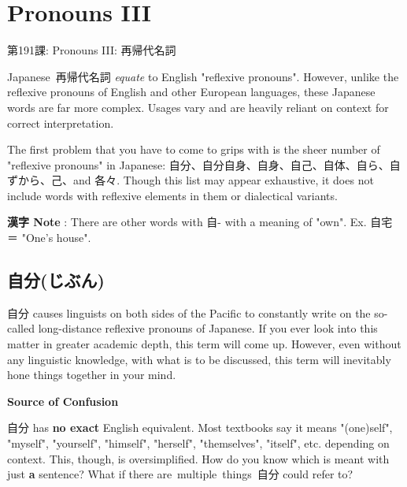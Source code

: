     
\chapter{Pronouns III}

\begin{center}
\begin{Large}
第191課: Pronouns III: 再帰代名詞 
\end{Large}
\end{center}
 
\par{ Japanese 再帰代名詞 \emph{equate }to English "reflexive pronouns". However, unlike the reflexive pronouns of English and other European languages, these Japanese words are far more complex. Usages vary and are heavily reliant on context for correct interpretation. }

\par{ The first problem that you have to come to grips with is the sheer number of "reflexive pronouns" in Japanese: 自分、自分自身、自身、自己、自体、自ら、自ずから、己、and 各々. Though this list may appear exhaustive, it does not include words with reflexive elements in them or dialectical variants. }

\par{\textbf{漢字 Note }: There are other words with 自- with a meaning of "own". Ex. 自宅　＝ "One's house". }
      
\section{自分(じぶん)}
 
\par{ 自分 causes linguists on both sides of the Pacific to constantly write on the so-called long-distance reflexive pronouns of Japanese. If you ever look into this matter in greater academic depth, this term will come up. However, even without any linguistic knowledge, with what is to be discussed, this term will inevitably hone things together in your mind. }

\begin{center}
 \textbf{Source of Confusion }
\end{center}

\par{ 自分 has \textbf{no exact }English equivalent. Most textbooks say it means "(one)self", "myself", "yourself", "himself", "herself", "themselves", "itself", etc. depending on context. This, though, is oversimplified. How do you know which is meant with just \textbf{a }sentence? What if there are multiple things 自分 could refer to? }

